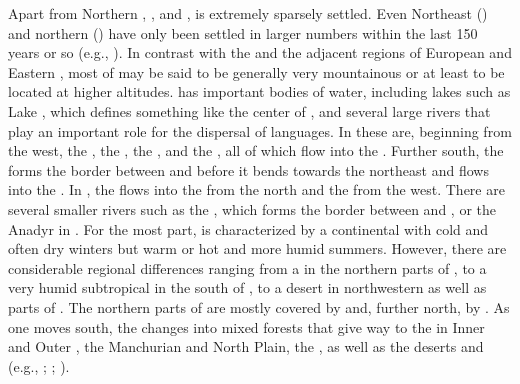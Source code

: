 Apart from Northern , , and ,  is extremely sparsely settled. Even Northeast  () and northern  () have only been settled in larger numbers within the last 150 years or so (e.g., \citealt{Janhunen1996}). In contrast with the  and the adjacent regions of European  and Eastern , most of  may be said to be generally very mountainous or at least to be located at higher altitudes.  has important bodies of water, including lakes such as Lake , which defines something like the center of , and several large rivers that play an important role for the dispersal of languages. In  these are, beginning from the west, the , the , the , and the , all of which flow into the . Further south, the  forms the border between  and  before it bends towards the northeast and flows into the . In , the  flows into the  from the north and the  from the west. There are several smaller rivers such as the , which forms the border between  and , or the Anadyr in . For the most part,  is characterized by a continental  with cold and often dry winters but warm or hot and more humid summers. However, there are considerable regional differences ranging from a   in the northern parts of , to a very humid subtropical  in the south of , to a desert  in northwestern  as well as parts of . The northern parts of  are mostly covered by  and, further north, by . As one moves south, the  changes into mixed forests that give way to the  in Inner and Outer , the Manchurian and North  Plain, the , as well as the deserts  and  (e.g., \citealt{Taaffe1990}; \citealt{Janhunen1996}; \citealt{NarangoaCribbs2014}).

